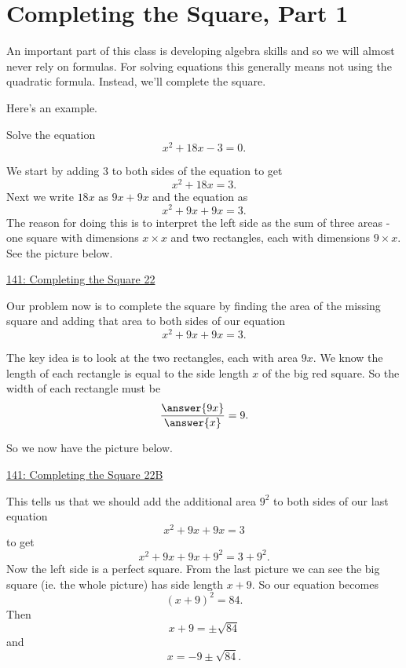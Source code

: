 \documentclass{ximera}
\begin{document}
\section{Completing the Square, Part 1}
An important part of this class is developing algebra skills and so we will almost never rely on formulas. For solving equations this generally means not using the quadratic formula. Instead, we'll complete the square.

Here's an example.

\begin{example}  \label{Exmve83r23r}
Solve the equation
\[
    x^2 + 18x -3 = 0.
\]

\begin{explanation}
We start by adding $3$ to both sides of the equation to get
\[
   x^2 + 18x = 3.
\]
Next we write $18x$ as $9x + 9x$ and the equation as
\[
   x^2 + 9x + 9x = 3.
\]
The reason for doing this is to interpret the left side as the sum of three areas - one square with dimensions  $x\times x$ and two rectangles, each with dimensions $9\times x$. See the picture below.

\begin{onlineOnly}
    \begin{center}
\end{center}
\end{onlineOnly}

\href{https://www.desmos.com/calculator/hz4c6f7tio}{141: Completing the Square 22}

Our problem now is to complete the square by finding the area of the missing square and adding that area to both sides of our equation
\[
    x^2 + 9x + 9x = 3.
\]

The key idea is to look at the two rectangles, each with area $9x$. We know the length of each rectangle is equal to the side length $x$ of the big red square. So the width of each rectangle must be
\[
    \frac{\answer{9x}}{\answer{x}} = 9 .
\]

So we now have the picture below.

\begin{onlineOnly}
    \begin{center}
\end{center}
\end{onlineOnly}

\href{https://www.desmos.com/calculator/arhlne3gxu}{141: Completing the Square 22B}

This tells us that we should add the additional area $9^2$ to both sides of our last equation
\[
      x^2 + 9x + 9x = 3
\]
to get
\[
   x^2 + 9x + 9x + 9^2 = 3 + 9^2 .
\]
Now the left side is a perfect square. From the last picture we can see the big square (ie. the whole picture) has side length $x+9$. So our equation becomes
\[
   (x + 9)^2 = 84 .
\]
Then 
\[
   x + 9 = \pm \sqrt{84}
\]
and
\[
     x = -9 \pm \sqrt{84} .
\]


\end{explanation}
\end{example}
\end{document}
